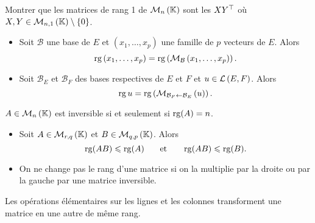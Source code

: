 \documentclass{magnolia}
\begin{document}
\begin{exoUnique}
\remarque Montrer que les matrices de rang 1 de $\mathcal{M}_{n}\left(\mathbb{K}\right)$  sont les
  $X{Y}^{\top}$ où $X,Y\in\mathcal{M}_{n,1}\left(\mathbb{K}\right)\setminus\left\{0\right\}$.
\end{exoUnique}


\begin{proposition}[utile=-3]
\begin{itemize}
\item Soit $\mathcal{B}$ une base de $E$ et $(x_1,\ldots,x_p)$ une famille de $p$
   vecteurs de $E$. Alors
  \[\operatorname{rg}\left(x_1,\ldots,x_p\right)=\operatorname{rg}\left(\mathcal{M}_{\mathcal{B}}\left(x_1,\ldots,x_p\right)\right).\]
\item Soit $\mathcal{B}_E$ et $\mathcal{B}_F$ des bases respectives de $E$ et $F$
  et $u\in\mathcal{L}\left(E,F\right)$. Alors
  \[\operatorname{rg} u=\operatorname{rg} \left(\mathcal{M}_{\mathcal{B}_F\gets\mathcal{B}_E}\left(u\right)\right).\]
\end{itemize}
\end{proposition}

\begin{proposition}[utile=-3]
$A\in\mathcal{M}_{n}\left(\mathbb{K}\right)$ est inversible si et seulement si $\operatorname{rg}(A)=n$.
\end{proposition}

\begin{proposition}
\begin{itemize}
\item Soit $A\in\mathcal{M}_{r,q}\left(\mathbb{K}\right)$ et $B\in\mathcal{M}_{q,p}\left(\mathbb{K}\right)$. Alors
  \[\operatorname{rg}(AB)\leqslant \operatorname{rg}(A) \quad\quad\!\text{et}\quad\!\quad \operatorname{rg}(AB)\leqslant \operatorname{rg}(B).\]
\item On ne change pas le rang d'une matrice si on la multiplie 
  par la droite ou par la gauche par une matrice inversible.
\end{itemize}
\end{proposition}

\begin{proposition}
Les opérations élémentaires sur les lignes et les colonnes transforment
une matrice en une autre de même rang.
\end{proposition}

\end{document}
